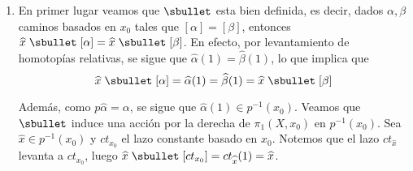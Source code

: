 \documentclass{article}
\begin{document}
\begin{enumerate}
    \item En primer lugar veamos que $\sbullet$ esta bien definida, es decir, dados $\alpha,\beta$
    caminos basados en $x_{0}$ tales que $[\alpha]=[\beta]$, entonces
    $\widehat{x}\hspace{1mm}{\sbullet}\hspace{1mm}[\alpha]
    =\widehat{x}\hspace{1mm}{\sbullet}\hspace{1mm}[\beta]$. En efecto, por levantamiento de 
    homotopías relativas, se sigue que $\widehat{\alpha}(1)=\widehat{\beta}(1)$, lo que implica 
    que
    \begin{equation*}
        \widehat{x}\hspace{1mm}{\sbullet}\hspace{1mm}[\alpha]=\widehat{\alpha}(1)
        =\widehat{\beta}(1)=\widehat{x}\hspace{1mm}{\sbullet}\hspace{1mm}[\beta]
    \end{equation*}

    Además, como $p\widehat{\alpha}=\alpha$, se sigue que $\widehat{\alpha}(1)\in p^{-1}(x_{0})$. 
    Veamos que $\sbullet$ induce una acción por la derecha de $\pi_{1}(X,x_{0})$ en 
    $p^{-1}(x_{0})$. Sea $\widehat{x}\in p^{-1}(x_{0})$ y $ct_{x_{0}}$ el lazo constante basado
    en $x_{0}$. Notemos que el lazo $ct_{\widehat{x}}$ levanta a $ct_{x_{0}}$, luego 
    $\widehat{x}\hspace{1mm}{\sbullet}\hspace{1mm}[ct_{x_{0}}]=ct_{\widehat{x}}(1)=\widehat{x}$.


\end{enumerate}
\end{document}
